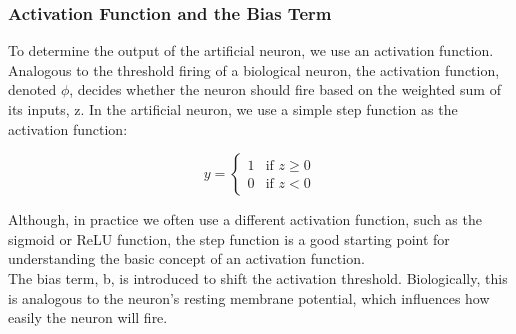 \documentclass[9pt]{extarticle}
\theoremstyle{plain}
\theoremstyle{definition}
\theoremstyle{remark}
\begin{document}
\subsubsection{Activation Function and the Bias Term}
To determine the output of the artificial neuron, we use an activation function.
Analogous to the threshold firing of a biological neuron, the activation function, denoted $\phi$,
decides whether the neuron should fire based on the weighted sum of its inputs,
z. In the artificial neuron, we use a simple step function as the activation function: \\
\begin{minipage}{0.49\textwidth}
    $$y = \begin{cases}
            1 & \text{if } z \geq 0 \\
            0 & \text{if } z < 0
        \end{cases}$$
\end{minipage}
\begin{minipage}{0.5\textwidth}
    \centering
\end{minipage}
Although, in practice we often use a different activation function, such as the sigmoid or ReLU function,
the step function is a good starting point for understanding the basic concept of an activation function.\\
The bias term, b, is introduced to shift the activation threshold. Biologically,
this is analogous to the neuron's resting membrane potential, which influences how easily
the neuron will fire.
\end{document}
